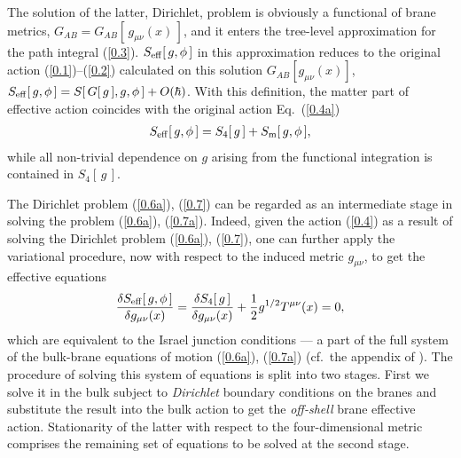\documentclass[a4paper,preprint,nofootinbib,
                 showpacs,preprintnumbers,amsmath,amssymb]{revtex4}
\begin{document}
The solution of the latter, Dirichlet, problem is obviously a 
functional of brane metrics, $G_{AB}=G_{AB}[\,g_{\mu\nu}(x)\,]$, 
and it enters the tree-level approximation for the path integral 
(\ref{0.3}). $S_{\rm eff}[\,g,\phi\,]$ in this approximation 
reduces to the original action (\ref{0.1})--(\ref{0.2}) calculated 
on this solution $G_{AB}[g_{\mu\nu}(x)]$, 
    $S_{\rm eff}[\,g,\phi\,]= 
    S[\,G[\,g\,],g,\phi\,]+O(\hbar)$.  
With this definition, the matter part of effective action 
coincides with the original action Eq.~(\ref{0.4a}) 
     \begin{eqnarray} 
     S_{\rm eff}[\,g,\phi\,]= 
     S_4[\,g\,]+S_{\rm m}[\,g,\phi\,],            \label{0.4} 
     \end{eqnarray} 
while all non-trivial dependence on $g$ arising from the functional 
integration is contained in $S_4[\,g\,]$. 
 
The Dirichlet problem (\ref{0.6a}), (\ref{0.7}) can be regarded as 
an intermediate stage in solving the problem (\ref{0.6a}), 
(\ref{0.7a}). Indeed, given the action (\ref{0.4}) as a result of 
solving the Dirichlet problem (\ref{0.6a}), (\ref{0.7}), one can further 
apply the variational procedure, now with respect to the induced 
metric $g_{\mu\nu}$, to get the effective equations 
     \begin{eqnarray} 
     \frac{\delta S_{\rm eff}[\,g,\phi\,]}{\delta g_{\mu\nu}(x)}= 
     \frac{\delta S_4[\,g\,]}{\delta g_{\mu\nu}(x)} 
     +\frac12 g^{1/2} T^{\mu\nu}(x)=0,              \label{0.8} 
     \end{eqnarray} 
which are equivalent to the Israel junction conditions --- a part 
of the full system of the bulk-brane equations of motion (\ref{0.6a}), 
(\ref{0.7a}) (cf.\ the appendix of \cite{gen}). The procedure of 
solving this system of equations is split into two stages. First 
we solve it in the bulk subject to {\em Dirichlet} boundary 
conditions on the branes and substitute the result into the bulk 
action to get the {\em off-shell} brane effective action. 
Stationarity of the latter with respect to the four-dimensional 
metric comprises the remaining set of equations to be solved at 
the second stage. 
 
\end{document}
